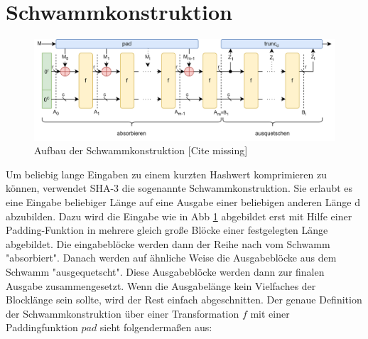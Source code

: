 \section{Schwammkonstruktion}
	\begin{figure}
		\center
		\includegraphics[scale=0.175]{images/Schwammkonstruktion.png}
		\caption{Aufbau der Schwammkonstruktion [Cite missing]}
		\label{fig:schwammkonstruktion}
	\end{figure}
	Um beliebig lange Eingaben zu einem kurzten Hashwert komprimieren zu können, verwendet SHA-3 die sogenannte Schwammkonstruktion.
	Sie erlaubt es eine Eingabe beliebiger Länge auf eine Ausgabe einer beliebigen anderen Länge d abzubilden.
	Dazu wird die Eingabe wie in Abb \ref{fig:schwammkonstruktion} abgebildet erst mit Hilfe einer Padding-Funktion in mehrere gleich große Blöcke einer festgelegten Länge abgebildet.
	Die eingabeblöcke werden dann der Reihe nach vom Schwamm "absorbiert". Danach werden auf ähnliche Weise die Ausgabeblöcke aus dem Schwamm "ausgequetscht".
	Diese Ausgabeblöcke werden dann zur finalen Ausgabe zusammengesetzt. Wenn die Ausgabelänge kein Vielfaches der Blocklänge sein sollte, wird der Rest einfach abgeschnitten.
	Der genaue Definition der Schwammkonstruktion über einer Transformation $f$ mit einer Paddingfunktion $pad$ sieht folgendermaßen aus:
	
